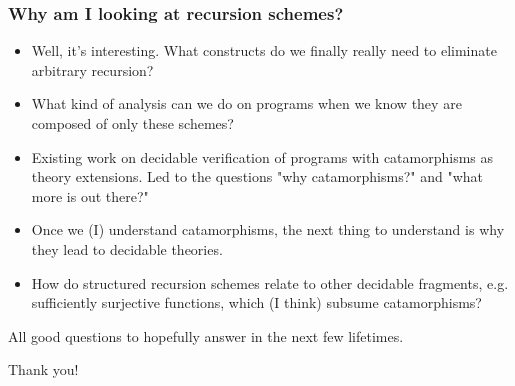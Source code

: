 \documentclass[
  aspectratio=1610, 
  xcolor={dvipsnames},
]{beamer}
\begin{document}


\begin{frame}
  \frametitle{Why am I looking at recursion schemes?}

  \begin{itemize}
    \item Well, it's interesting. What constructs do we finally really need to
    eliminate arbitrary recursion?
    \item What kind of analysis can we do on programs when we know they are
    composed of only these schemes?
    \item Existing work on decidable verification of programs with catamorphisms
    as theory extensions. Led to the questions "why catamorphisms?" and "what
    more is out there?"
    \item Once we (I) understand catamorphisms, the next thing to understand is
    why they lead to decidable theories. 
    \item How do structured recursion schemes relate to other decidable
    fragments, e.g. sufficiently surjective functions, which (I think) subsume
    catamorphisms? 
  \end{itemize}

  All good questions to hopefully answer in the next few lifetimes.

\end{frame}

\begin{frame}

  \begin{center}
    \Huge Thank you!
  \end{center}

\end{frame}



\end{document}
